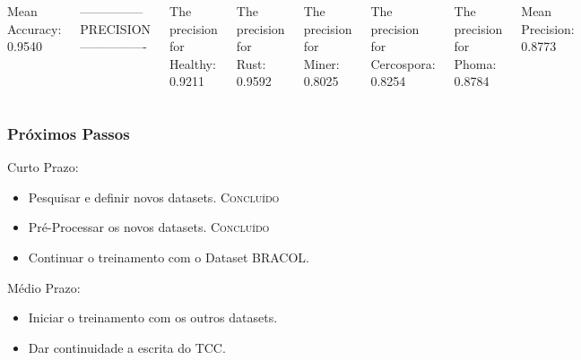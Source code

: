 \documentclass[aspectratio=169]{beamer}
\begin{document}
\begin{frame}
\begin{columns}
        Mean Accuracy:   0.9540

        --------------- PRECISION ----------------

        The precision for Healthy: 0.9211

        The precision for Rust: 0.9592

        The precision for Miner: 0.8025

        The precision for Cercospora: 0.8254

        The precision for Phoma: 0.8784

        Mean Precision: 0.8773

    \end{columns}
\end{frame}










\begin{frame}
    \frametitle{Próximos Passos}

    \begin{block}{Curto Prazo:}

        \begin{itemize}
            \item Pesquisar e definir novos datasets. \textsc{Concluído}
            \item Pré-Processar os novos datasets. \textsc{Concluído}
            \item \color{blue} Continuar o treinamento com o Dataset BRACOL.
        \end{itemize}

    \end{block}



    \begin{block}{Médio Prazo:}

        \begin{itemize}
            \item \color{blue} Iniciar o treinamento com os outros datasets.
            \item \color{blue} Dar continuidade a escrita do TCC.
        \end{itemize}

    \end{block}




\end{frame}
\end{document}
